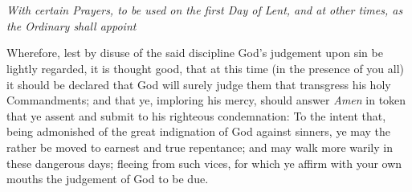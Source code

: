 \chapter[A Commination]{}
{\centering\footnotesize\emph{With certain Prayers, to be used on the first Day of Lent, and at other times, as the Ordinary shall appoint}\par}




\medskip
{}


Wherefore, lest by disuse of the said discipline God’s judgement upon sin be lightly regarded, it is thought good, that at this time (in the presence of you all) it should be declared that God will surely judge them that transgress his holy Commandments; and that ye, imploring his mercy, should answer \emph{Amen} in token that ye assent and submit to his righteous condemnation: To the intent that, being admonished of the great indignation of God against sinners, ye may the rather be moved to earnest and true repentance; and may walk more warily in these dangerous days; fleeing from such vices, for which ye affirm with your own mouths the judgement of God to be due.







